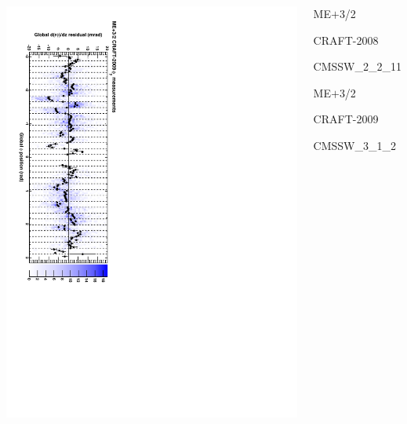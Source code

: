 \documentclass[compress]{beamer}
\begin{document}
\begin{frame}
\begin{columns}
\includegraphics[height=\linewidth, angle=90]{correspondance_2009_mep32_phiy.pdf}
\begin{center}
ME$+$3/2

CRAFT-2008

CMSSW\_2\_2\_11

\vspace{1.5 cm}
ME$+$3/2

CRAFT-2009

CMSSW\_3\_1\_2

\vspace{0.5 cm}
\mbox{ }
\end{center}
\end{columns}
\end{frame}
\end{document}
